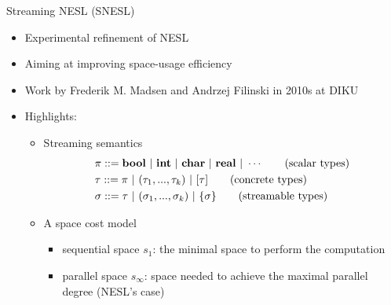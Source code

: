 \documentclass{beamer}
\begin{document}
\begin{frame}{Streaming NESL (SNESL)}
	\begin{itemize}
		\item Experimental refinement of NESL
		\item Aiming at improving space-usage efficiency 
		\item Work by Frederik M. Madsen and Andrzej Filinski in 2010s at DIKU
		\item Highlights:
		\begin{itemize}
			\item Streaming semantics 
			\begin{align*} 
			& \pi ::= \bool \ | \ \int \ | \ \*{char} \ | \ \*{real}  \ | \ \cdots \tag{scalar types}\\
			& \tau ::= \pi \ | \ (\tau_1,...,\tau_k) \ | \ [\tau] \tag{concrete types} \\
			& \sigma ::= \tau \ | \ (\sigma_1,...,\sigma_k) \ | \ \tseq{\sigma}  \tag{streamable types} 
			\end{align*}
			
			\item A space cost model
			\begin{itemize}
				\item sequential space $s_1$: the minimal space to perform the computation
				\item parallel space $s_\infty$: space needed to achieve the maximal parallel degree (NESL's case)
			\end{itemize}
		\end{itemize}
	\end{itemize}
\end{frame}
\end{document}
